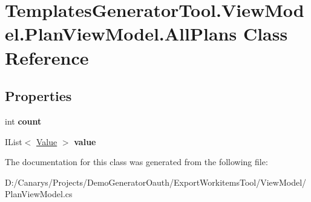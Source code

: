 \hypertarget{class_templates_generator_tool_1_1_view_model_1_1_plan_view_model_1_1_all_plans}{}\section{Templates\+Generator\+Tool.\+View\+Model.\+Plan\+View\+Model.\+All\+Plans Class Reference}
\label{class_templates_generator_tool_1_1_view_model_1_1_plan_view_model_1_1_all_plans}
\subsection*{Properties}
\begin{DoxyCompactItemize}
\item 
\mbox{\label{class_templates_generator_tool_1_1_view_model_1_1_plan_view_model_1_1_all_plans_a1fba491cb65b0e5612451a4069c77424}} 
int {\bfseries count}
\item 
\mbox{\label{class_templates_generator_tool_1_1_view_model_1_1_plan_view_model_1_1_all_plans_a705d3245389f28bd3cc8d62044561a3d}} 
I\+List$<$ \mbox{\hyperlink{class_templates_generator_tool_1_1_view_model_1_1_plan_view_model_1_1_value}{Value}} $>$ {\bfseries value}
\end{DoxyCompactItemize}


The documentation for this class was generated from the following file\+:\begin{DoxyCompactItemize}
\item 
D\+:/\+Canarys/\+Projects/\+Demo\+Generator\+Oauth/\+Export\+Workitems\+Tool/\+View\+Model/Plan\+View\+Model.\+cs\end{DoxyCompactItemize}
